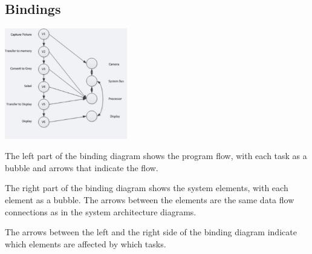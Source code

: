 	\subsection{Bindings}
		\begin{multicols}{2}
			\includegraphics[width=0.4\textwidth]{./pictures/bindings.png} 
			\begin{compactitem}
			  \item The left part of the binding diagram shows the program flow, with each task as a bubble and arrows that indicate the flow. 
			  \item The right part of the binding diagram shows the system elements, with each element as a bubble. The arrows between the elements are the same data flow connections as in the system architecture diagrams.
			  \item The arrows between the left and the right side of the binding diagram indicate which elements are affected by which tasks.
			\end{compactitem}		
		\end{multicols}